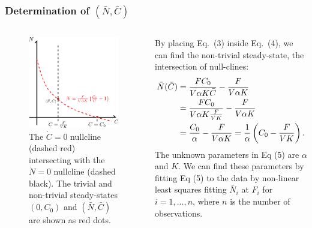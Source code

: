 \documentclass{beamer}
\begin{document}
\begin{frame}
  \frametitle{Determination of $(\bar{N}, \bar{C})$}
  \begin{columns}
  \begin{column}{0.4\textwidth}
  \begin{figure}[H]
    \centering
      \includegraphics[width=1.0\textwidth]{../doc/images/drawing.png}
    \caption{\footnotesize The $\dot{C} = 0$ nullcline (dashed red) intersecting with the $\dot{N} = 0$ nullcline (dashed black).  The trivial and non-trivial steady-states $(0, C_0)$ and $(\bar{N}, \bar{C})$ are shown as red dots.}
  \end{figure}
  \end{column}
  \begin{column}{0.6\textwidth}
  \scriptsize
  By placing Eq.\ (3) inside Eq.\ (4), we can find the non-trivial steady-state, the intersection of null-clines:
  \begin{align}
    \bar{N}(\bar{C}) &= \frac{FC_0}{V \alpha K \bar{C}} - \frac{F}{V \alpha K}  \notag \\
    &= \frac{FC_0}{V \alpha K \frac{F}{VK}} - \frac{F}{V \alpha K} \notag \\
    &= \frac{C_0}{\alpha} - \frac{F}{V \alpha K} = \frac{1}{\alpha} \left( C_0 - \frac{F}{VK} \right).
  \end{align}
  The unknown parameters in Eq (5) are $\alpha$ and $K$.  We can find these parameters by fitting Eq (5) to the data by non-linear least squares fitting $\bar{N}_i$ at $F_i$ for $i = 1,\ldots,n$, where $n$ is the number of observations.
  \normalsize
  \end{column}
  \end{columns}
\end{frame}
\end{document}
